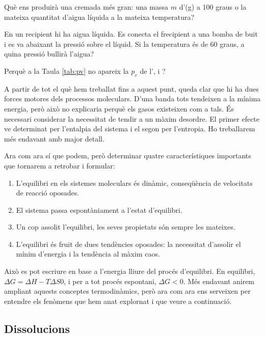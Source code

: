 \begin{exr}
Què ens produirà una cremada més gran: una massa $m$ d'(g) a 100 graus o la mateixa quantitat d'aigua líquida a la mateixa temperatura?
\end{exr}

\begin{exr}
En un recipient hi ha aigua líquida. Es conecta el frecipient a una bomba de buit i es va abaixant la pressió sobre el líquid. Si la temperatura és de 60 graus, a quina pressió bullirà l'aigua?
\end{exr}

\begin{exr}
Perquè a la Taula \ref{tab:pv} no apareix la $p_v$ de l',  i ?
\end{exr}

A partir de tot el què hem treballat fins a aquest punt, queda clar que hi ha dues forces motores dels processos moleculars. D'una banda tots tendeixen a la mínima energia, però això no explicaria perquè els gasos existeixen com a tals. És necessari considerar la necessitat de tendir a un màxim desordre. El primer efecte ve determinat per l'entalpia del sistema i el segon per l'entropia. Ho treballarem més endavant amb major detall.

Ara com ara sí que podem, però determinar quatre característiques importants que tornarem a retrobar i formular:
\begin{enumerate}
\item L'equilibri en els sistemes moleculars és dinàmic, conseqüència de velocitats de reacció oposades.
\item El sistema passa espontàniament a l'estat d'equilibri.
\item Un cop assolit l'equilibri, les seves propietats són sempre les mateixes.
\item L'equilibri és fruit de dues tendències oposades: la necessitat d'assolir el mínim d'energia i la tendència al màxim caos.
\end{enumerate}

Això es pot escriure en base a l'energia lliure del procés d'equilibri. En equilibri, $\Delta G=\Delta H - T\Delta S0$, i per a tot procés espontani, $\Delta G <0$.
Més endavant anirem ampliant aquests conceptes termodinàmics, però ara com ara ens serveixen per entendre els fenòmens que hem anat explornat i que veure a continuació.

\subsection{Dissolucions}


